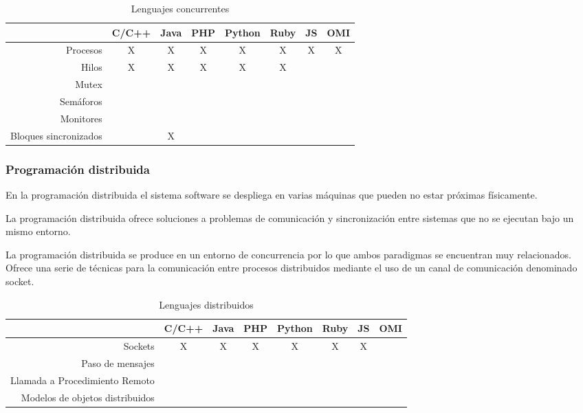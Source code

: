 \FloatBarrier
\begin{table}[h]
\begin{center}
 
\begin{tabular}{|r|c|c|c|c|c|c|c|} \hline
 & C/C++ & Java & PHP  & Python & Ruby & JS & OMI\\ \hline
Procesos & X & X & X & X & X  & X & X \\ \hline
Hilos & X & X & X & X & X &  &  \\ \hline
Mutex &  & &  &  & &  &  \\ \hline
Semáforos &  & &  &  & &  &  \\ \hline
Monitores & & & & & &  &  \\ \hline
Bloques sincronizados & & X  & & & &  &  \\ \hline
\end{tabular}
\caption{Lenguajes concurrentes}
\end{center}
\end{table}
\FloatBarrier



\subsubsection{Programación distribuida}
En la programación distribuida el sistema software se despliega 
en varias máquinas que pueden no estar próximas físicamente.  

La programación distribuida ofrece soluciones a problemas de 
comunicación y sincronización entre sistemas que no se
ejecutan bajo un mismo entorno. 

La programación distribuida se produce en un entorno de concurrencia por lo
que ambos paradigmas se encuentran muy relacionados. Ofrece una serie de técnicas para la comunicación entre procesos distribuidos mediante el uso de un canal de comunicación 
denominado socket. 

\FloatBarrier
\begin{table}[h]
\begin{center}
 
\begin{tabular}{|r|c|c|c|c|c|c|c|} \hline
 & C/C++ & Java & PHP  & Python & Ruby & JS & OMI\\ \hline
Sockets & X & X & X & X & X  & X &  \\ \hline
Paso de mensajes & & &  &  &  &  &  \\ \hline
Llamada a Procedimiento Remoto & & &  &  &  &  &  \\ \hline
Modelos de objetos distribuidos & & &  &  &  &  &  \\ \hline
\end{tabular}
\caption{Lenguajes distribuidos}
\end{center}
\end{table}
\FloatBarrier

